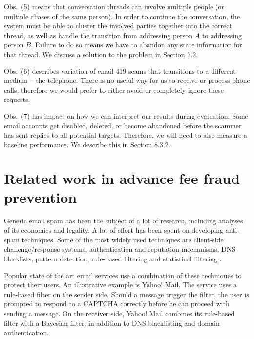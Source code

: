 Obs.~(5) means that conversation threads can involve multiple people (or multiple aliases of the same person). In order to continue the conversation, the system must be able to cluster the involved parties together into the correct thread, as well as handle the transition from addressing person $A$ to addressing person $B$. Failure to do so means we have to abandon any state information for that thread. We discuss a solution to the problem in Section 7.2.

Obs.~(6) describes variation of email 419 scams that transitions to a different medium -- the telephone. There is no useful way for us to receive or process phone calls, therefore we would prefer to either avoid or completely ignore these requests.

Obs.~(7) has impact on how we can interpret our results during evaluation. Some email accounts get disabled, deleted, or become abandoned before the scammer has sent replies to all potential targets. Therefore, we will need to also measure a baseline performance. We describe this in Section 8.3.2.

\section{Related work in advance fee fraud prevention}
Generic email spam has been the subject of a lot of research, including analyses of its economics and legality. A lot of effort has been spent on developing anti-spam techniques. Some of the most widely used techniques are client-side challenge/response systems, authentication and reputation mechanisms, DNS blacklists, pattern detection, rule-based filtering and statistical filtering \cite{P5, P6, P7}.

Popular state of the art email services use a combination of these techniques to protect their users. An illustrative example is Yahoo! Mail. The service uses a rule-based filter on the sender side. Should a message trigger the filter, the user is prompted to respond to a CAPTCHA correctly before he can proceed with sending a message. On the receiver side, Yahoo! Mail combines its rule-based filter with a Bayesian filter, in addition to DNS blacklisting and domain authentication. 

